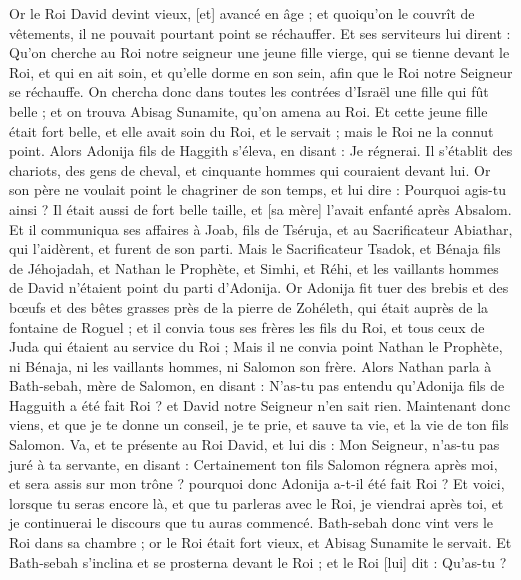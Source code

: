 \BFont
\begin{multicols}{2}
\VerseOne{}Or le Roi David devint vieux, [et] avancé en âge ; et quoiqu'on le couvrît de vêtements, il ne pouvait pourtant point se réchauffer.
Et ses serviteurs lui dirent : Qu'on cherche au Roi notre seigneur une jeune fille vierge, qui se tienne devant le Roi, et qui en ait soin, et qu'elle dorme en son sein, afin que le Roi notre Seigneur se réchauffe.
On chercha donc dans toutes les contrées d'Israël une fille qui fût belle ; et on trouva Abisag Sunamite, qu'on amena au Roi.
Et cette jeune fille était fort belle, et elle avait soin du Roi, et le servait ; mais le Roi ne la connut point.
Alors Adonija fils de Haggith s'éleva, en disant : Je régnerai. Il s'établit des chariots, des gens de cheval, et cinquante hommes qui couraient devant lui.
Or son père ne voulait point le chagriner de son temps, et lui dire : Pourquoi agis-tu ainsi ? Il était aussi de fort belle taille, et [sa mère] l'avait enfanté après Absalom.
Et il communiqua ses affaires à Joab, fils de Tséruja, et au Sacrificateur Abiathar, qui l'aidèrent, et furent de son parti.
Mais le Sacrificateur Tsadok, et Bénaja fils de Jéhojadah, et Nathan le Prophète, et Simhi, et Réhi, et les vaillants hommes de David n'étaient point du parti d'Adonija.
Or Adonija fit tuer des brebis et des bœufs et des bêtes grasses près de la pierre de Zohéleth, qui était auprès de la fontaine de Roguel ; et il convia tous ses frères les fils du Roi, et tous ceux de Juda qui étaient au service du Roi ;
Mais il ne convia point Nathan le Prophète, ni Bénaja, ni les vaillants hommes, ni Salomon son frère.
Alors Nathan parla à Bath-sebah, mère de Salomon, en disant : N'as-tu pas entendu qu'Adonija fils de Hagguith a été fait Roi ? et David notre Seigneur n'en sait rien.
Maintenant donc viens, et que je te donne un conseil, je te prie, et sauve ta vie, et la vie de ton fils Salomon.
Va, et te présente au Roi David, et lui dis : Mon Seigneur, n'as-tu pas juré à ta servante, en disant : Certainement ton fils Salomon régnera après moi, et sera assis sur mon trône ? pourquoi donc Adonija a-t-il été fait Roi ?
Et voici, lorsque tu seras encore là, et que tu parleras avec le Roi, je viendrai après toi, et je continuerai le discours que tu auras commencé.
Bath-sebah donc vint vers le Roi dans sa chambre ; or le Roi était fort vieux, et Abisag Sunamite le servait.
Et Bath-sebah s'inclina et se prosterna devant le Roi ; et le Roi [lui] dit : Qu'as-tu ?

\end{multicols}
